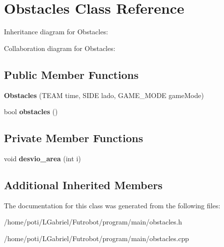 \hypertarget{classObstacles}{}\section{Obstacles Class Reference}
\label{classObstacles}


Inheritance diagram for Obstacles\+:


Collaboration diagram for Obstacles\+:
\subsection*{Public Member Functions}
\begin{DoxyCompactItemize}
\item 
{\bfseries Obstacles} (T\+E\+AM time, S\+I\+DE lado, G\+A\+M\+E\+\_\+\+M\+O\+DE game\+Mode)\hypertarget{classObstacles_a3d5634d14d2ce25334ca63404a1c29a2}{}\label{classObstacles_a3d5634d14d2ce25334ca63404a1c29a2}

\item 
bool {\bfseries obstacles} ()\hypertarget{classObstacles_aaa03a25e292fab3b9b8169b7dc699d09}{}\label{classObstacles_aaa03a25e292fab3b9b8169b7dc699d09}

\end{DoxyCompactItemize}
\subsection*{Private Member Functions}
\begin{DoxyCompactItemize}
\item 
void {\bfseries desvio\+\_\+area} (int i)\hypertarget{classObstacles_a81f1a37173d5899a080093e48d5c2b73}{}\label{classObstacles_a81f1a37173d5899a080093e48d5c2b73}

\end{DoxyCompactItemize}
\subsection*{Additional Inherited Members}


The documentation for this class was generated from the following files\+:\begin{DoxyCompactItemize}
\item 
/home/poti/\+L\+Gabriel/\+Futrobot/program/main/obstacles.\+h\item 
/home/poti/\+L\+Gabriel/\+Futrobot/program/main/obstacles.\+cpp\end{DoxyCompactItemize}

